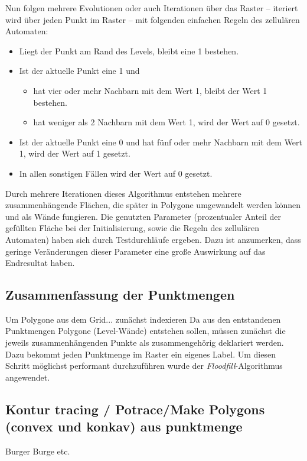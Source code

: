 \documentclass[10pt,a4paper]{article}
\begin{document}
Nun folgen mehrere Evolutionen oder auch Iterationen über das Raster -- iteriert wird über jeden Punkt im Raster -- mit folgenden einfachen Regeln des zellulären Automaten:
\begin{itemize}
\item{} Liegt der Punkt am Rand des Levels, bleibt eine 1 bestehen.
\item{} Ist der aktuelle Punkt eine 1 und
	\begin{itemize}
	\item{} hat vier oder mehr Nachbarn mit dem Wert 1, bleibt der Wert 1 bestehen.
	\item{} hat weniger als 2 Nachbarn mit dem Wert 1, wird der Wert auf 0 gesetzt.%
	\end{itemize}
\item{} Ist der aktuelle Punkt eine 0 und hat fünf oder mehr Nachbarn mit dem Wert 1, wird der Wert auf 1 gesetzt.
\item{} In allen sonstigen Fällen wird der Wert auf 0 gesetzt.
\end{itemize}

Durch mehrere Iterationen dieses Algorithmus entstehen mehrere zusammenhängende Flächen, die später in Polygone umgewandelt werden können und als Wände fungieren. Die genutzten Parameter (prozentualer Anteil der gefüllten Fläche bei der Initialisierung, sowie die Regeln des zellulären Automaten) haben sich durch Testdurchläufe ergeben. Dazu ist anzumerken, dass geringe Veränderungen dieser Parameter eine große Auswirkung auf das Endresultat haben. %



\subsection{Zusammenfassung der Punktmengen}
Um Polygone aus dem Grid... zunächst indexieren
Da aus den entstandenen Punktmengen Polygone (Level-Wände) entstehen sollen, müssen zunächst die jeweils zusammenhängenden Punkte als zusammengehörig deklariert werden. Dazu bekommt jeden Punktmenge im Raster ein eigenes Label. Um diesen Schritt möglichst performant durchzuführen wurde der \textit{Floodfill}-Algorithmus angewendet. %




\subsection{Kontur tracing / Potrace/Make Polygons (convex und konkav) aus punktmenge}
Burger Burge etc.
\end{document}
